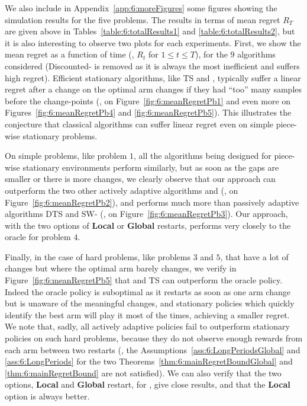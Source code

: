 We also include in Appendix~\ref{app:6:moreFigures} some figures showing the simulation results for the five problems.
The results in terms of mean regret $R_T$ are given above in Tables~\ref{table:6:totalResults1} and \ref{table:6:totalResults2}, but it is also interesting to observe two plots for each experiments.
%
First, we show the mean regret as a function of time (\ie, $R_t$ for $1 \leq t \leq T$), for the $9$ algorithms considered (Discounted-\klUCB{} is removed as it is always the most inefficient and suffers high regret).
%
Efficient stationary algorithms, like TS and \klUCB, typically suffer a linear regret after a change on the optimal arm changes if they had ``too'' many samples before the change-points (\eg, on Figure~\ref{fig:6:meanRegretPb1} and even more on Figures~\ref{fig:6:meanRegretPb4} and \ref{fig:6:meanRegretPb5}).
This illustrates the conjecture that classical algorithms can suffer linear regret even on simple piece-wise stationary problems.

On simple problems, like problem $1$, all the algorithms being designed for piece-wise stationary environments perform similarly, but as soon as the gaps are smaller or there is more changes, we clearly observe that our approach \GLRklUCB{} can outperform the two other actively adaptive algorithms \CUSUMklUCB{} and \MklUCB{} (\eg, on Figure~\ref{fig:6:meanRegretPb2}), and performs much more than passively adaptive algorithms DTS and SW-\klUCB{}  (\eg, on Figure~\ref{fig:6:meanRegretPb3}).
Our approach, with the two options of \textbf{Local} or \textbf{Global} restarts, performs very closely to the oracle for problem $4$.

Finally, in the case of hard problems, like problems $3$ and $5$, that have a lot of changes but where the optimal arm barely changes, we verify in Figure~\ref{fig:6:meanRegretPb5} that \klUCB{} and TS can outperform the oracle policy.
Indeed the oracle policy is suboptimal as it restarts as soon as one arm change but is unaware of the meaningful changes, and stationary policies which quickly identify the best arm will play it most of the times, achieving a smaller regret.
We note that, sadly, all actively adaptive policies fail to outperform stationary policies on such hard problems, because they do not observe enough rewards from each arm between two restarts (\ie, the Assumptions~\ref{ass:6:LongPeriodsGlobal} and \ref{ass:6:LongPeriods} for the two Theorems~\ref{thm:6:mainRegretBoundGlobal} and \ref{thm:6:mainRegretBound} are not satisfied).
We can also verify that the two options, \textbf{Local} and \textbf{Global} restart, for \GLRklUCB, give close results, and that the \textbf{Local} option is always better.

